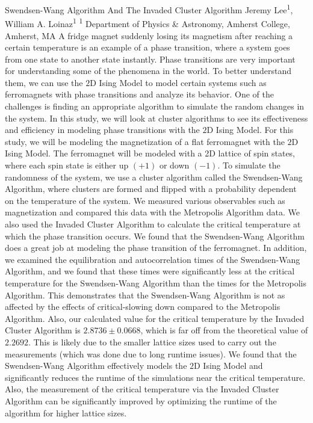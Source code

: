 \makeabstract
{ %
Swendsen-Wang Algorithm And The Invaded Cluster Algorithm
}
{ %
Jeremy Lee\textsuperscript{1},
William A. Loinaz\textsuperscript{1}
}
{ %
\textsuperscript{1} Department of Physics \& Astronomy, Amherst College, Amherst, MA
}
{ %
 A fridge magnet suddenly losing its magnetism after reaching a certain temperature is an example of a phase transition, where a system goes from one state to another state instantly. Phase transitions are very important for understanding some of the phenomena in the world. To better understand them, we can use the $2$D Ising Model to model certain systems such as ferromagnets with phase transitions and analyze its behavior. One of the challenges is finding an appropriate algorithm to simulate the random changes in the system. In this study, we will look at cluster algorithms to see its effectiveness and efficiency in modeling phase transitions with the $2$D Ising Model. 
}
{ %
For this study, we will be modeling the magnetization of a flat ferromagnet with the $2$D Ising Model. The ferromagnet will be modeled with a 2D lattice of spin states, where each spin state is either up $(+1)$ or down $(-1)$. To simulate the randomness of the system, we use a cluster algorithm called the Swendsen-Wang Algorithm, where clusters are formed and flipped with a probability dependent on the temperature of the system. We measured various observables such as magnetization and compared this data with the Metropolis Algorithm data. We also used the Invaded Cluster Algorithm to calculate the critical temperature at which the phase transition occurs.
}
{ %
We found that the Swendsen-Wang Algorithm does a great job at modeling the phase transition of the ferromagnet. In addition, we examined the equilibration and autocorrelation times of the Swendsen-Wang Algorithm, and we found that these times were significantly less at the critical temperature for the Swendsen-Wang Algorithm than the times for the Metropolis Algorithm. This demonstrates that the Swendsen-Wang Algorithm is not as affected by the effects of critical-slowing down compared to the Metropolis Algorithm. Also, our calculated value for the critical temperature by the Invaded Cluster Algorithm is $2.8736\pm0.0668$, which is far off from the theoretical value of $2.2692$. This is likely due to the smaller lattice sizes used to carry out the measurements (which was done due to long runtime issues).
}
{ %
We found that the Swendsen-Wang Algorithm effectively models the $2$D Ising Model and significantly reduces the runtime of the simulations near the critical temperature. Also, the measurement of the critical temperature via the Invaded Cluster Algorithm can be significantly improved by optimizing the runtime of the algorithm for higher lattice sizes. 
}

 \newpage
